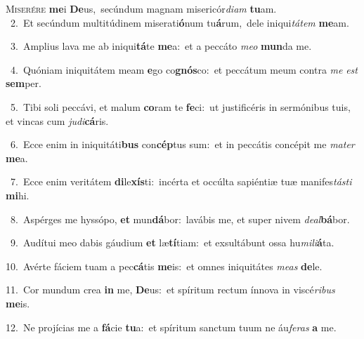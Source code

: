 \lettrine{\initial\textcolor{\initialcolor}{M}}{iserére} \textbf{me}\-i \textbf{De}\-us,~\star secúndum magnam misericór\-\textit{di}\-\textit{am} \textbf{tu}\-am.\\
{\numbfont\textcolor{\numbcolor}{~2.}}~Et secúndum multitúdinem miserati\-\textbf{ó}\-num tu\-\textbf{á}\-rum,~\star dele iniqui\-\textit{tá}\-\textit{tem} \textbf{me}\-am.\par
{\numbfont\textcolor{\numbcolor}{~3.}}~Amplius lava me ab iniqui\-\textbf{tá}\-te \textbf{me}\-a:~\star et a peccáto \textit{me}\-\textit{o} \textbf{mun}\-da me.\par
{\numbfont\textcolor{\numbcolor}{~4.}}~Quóniam iniquitátem meam \textbf{e}\-go co\-\textbf{gnós}\-co:~\star et peccátum meum contra \textit{me} \textit{est} \textbf{sem}\-per.\par
{\numbfont\textcolor{\numbcolor}{~5.}}~Tibi soli peccávi, et malum \textbf{co}\-ram te \textbf{fe}\-ci:~\star ut justificéris in sermónibus tuis, et vincas cum \textit{ju}\-\textit{di}\textbf{cá}ris.\par
{\numbfont\textcolor{\numbcolor}{~6.}}~Ecce enim in iniquitáti\textbf{bus} con\-\textbf{cép}\-tus sum:~\star et in peccátis concépit me \textit{ma}\-\textit{ter} \textbf{me}\-a.\par
{\numbfont\textcolor{\numbcolor}{~7.}}~Ecce enim veritátem \textbf{di}\-le\-\textbf{xís}\-ti:~\star incérta et occúlta sapiéntiæ tuæ manifes\-\textit{tás}\-\textit{ti} \textbf{mi}\-hi.\par
{\numbfont\textcolor{\numbcolor}{~8.}}~Aspérges me hyssópo, \textbf{et} mun\-\textbf{dá}\-bor:~\star lavábis me, et super nivem \textit{de}\-\textit{al}\textbf{bá}bor.\par
{\numbfont\textcolor{\numbcolor}{~9.}}~Audítui meo dabis gáudium \textbf{et} læ\-\textbf{tí}\-tiam:~\star et exsultábunt ossa hu\-\textit{mi}\-\textit{li}\textbf{á}ta.\par
{\numbfont\textcolor{\numbcolor}{10.}}~Avérte fáciem tuam a pec\-\textbf{cá}\-tis \textbf{me}\-is:~\star et omnes iniquitátes \textit{me}\-\textit{as} \textbf{de}\-le.\par
{\numbfont\textcolor{\numbcolor}{11.}}~Cor mundum crea \textbf{in} me, \textbf{De}\-us:~\star et spíritum rectum ínnova in viscé\-\textit{ri}\-\textit{bus} \textbf{me}\-is.\par
{\numbfont\textcolor{\numbcolor}{12.}}~Ne projícias me a \textbf{fá}\-cie \textbf{tu}\-a:~\star et spíritum sanctum tuum ne áu\-\textit{fe}\-\textit{ras} \textbf{a} me.\par
